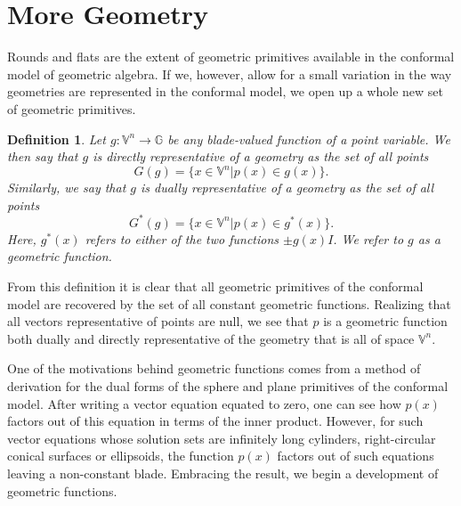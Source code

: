 \documentclass[12pt]{article}
\newcommand{\G}{\mathbb{G}}
\newcommand{\V}{\mathbb{V}}
\newtheorem{definition}{Definition}[section]
\begin{document}
\section{More Geometry}

Rounds and flats are the extent of geometric primitives available in the conformal
model of geometric algebra.  If we, however, allow for a small variation in the way
geometries are represented in the conformal model, we open up a whole new set
of geometric primitives.

\begin{definition}
Let $g:\V^n\to\G$ be any blade-valued function of a point variable.
We then say that $g$ is directly representative of a geometry as
the set of all points
\begin{equation*}
G(g)=\{x\in\V^n|p(x)\in g(x)\}.
\end{equation*}
Similarly, we say that $g$ is dually representative of a geometry as the set
of all points
\begin{equation*}
G^*(g) = \{x\in\V^n|p(x)\in g^*(x)\}.
\end{equation*}
Here, $g^*(x)$ refers to either of the two functions $\pm g(x)I$.
We refer to $g$ as a geometric function.
\end{definition}
From this definition it is clear that all geometric primitives of the conformal model
are recovered by the set of all constant geometric functions.  Realizing that
all vectors representative of points are null, we see that $p$ is a geometric
function both dually and directly representative of the geometry that is all
of space $\V^n$.

One of the motivations behind geometric functions comes from a method
of derivation for the dual forms of the sphere and plane primitives of
the conformal model.  After writing a vector equation equated to zero,
one can see how $p(x)$ factors out of this equation in terms of the inner product.
However, for such vector equations whose solution sets are infinitely long cylinders,
right-circular conical surfaces or ellipsoids, the function $p(x)$ factors out of such
equations leaving a non-constant blade.  Embracing the result, we begin a
development of geometric functions.
\end{document}
